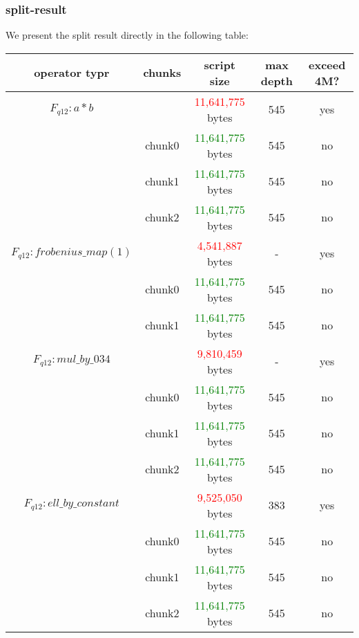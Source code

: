 \subsubsection{split-result}

We present the split result directly in the following table:

\begin{center}
\begin{tabular}{|c|c|c|c|c|} \hline
    operator typr & chunks & script size & max depth & exceed 4M? \\ \hline
    $F_{q12}: a * b$ & & \textcolor{red}{11,641,775} bytes & 545 & yes \\ \hline
     & chunk0 & \textcolor{green}{11,641,775} bytes & 545 & no \\ \hline
     & chunk1 & \textcolor{green}{11,641,775} bytes & 545 & no \\ \hline
     & chunk2 & \textcolor{green}{11,641,775} bytes & 545 & no \\ \hline
    $F_{q12}: frobenius\_map(1)$ & & \textcolor{red}{4,541,887} bytes & - & yes \\ \hline
    & chunk0 & \textcolor{green}{11,641,775} bytes & 545 & no \\ \hline
    & chunk1 & \textcolor{green}{11,641,775} bytes & 545 & no \\ \hline
    $F_{q12}: mul\_by\_034$ & & \textcolor{red}{9,810,459} bytes & - & yes \\ \hline
    & chunk0 & \textcolor{green}{11,641,775} bytes & 545 & no \\ \hline
    & chunk1 & \textcolor{green}{11,641,775} bytes & 545 & no \\ \hline
    & chunk2 & \textcolor{green}{11,641,775} bytes & 545 & no \\ \hline
    $F_{q12}: ell\_by\_constant$ & & \textcolor{red}{9,525,050} bytes & 383 & yes \\ \hline
    & chunk0 & \textcolor{green}{11,641,775} bytes & 545 & no \\ \hline
    & chunk1 & \textcolor{green}{11,641,775} bytes & 545 & no \\ \hline
    & chunk2 & \textcolor{green}{11,641,775} bytes & 545 & no \\ \hline
\end{tabular}
\end{center}
